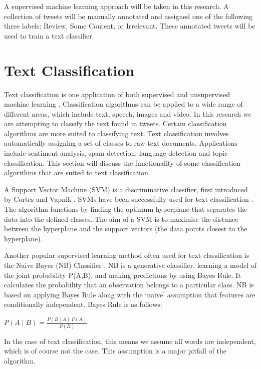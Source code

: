 A supervised machine learning approach will be taken in this research. A collection of tweets will be manually annotated and assigned one of the following three labels: Review, Some Content, or Irrelevant. These annotated tweets will be used to train a text classifier. 

\section{Text Classification}

Text classification is one application of both supervised and unsupervised machine learning \cite{khan2010}. Classification algorithms can be applied to a wide range of different areas, which include text, speech, images and video. In this research we are attempting to classify the text found in tweets. Certain classification algorithms are more suited to classifying text. Text classification involves automatically assigning a set of classes to raw text documents. Applications include sentiment analysis, spam detection, language detection and topic classification. This section will discuss the functionality of some classification algorithms that are suited to text classification. 



A Support Vector Machine (SVM) is a discriminative classifier, first introduced by Cortes and Vapnik \cite{Vapnik1995,  Vapnik21995}. SVMs have been successfully used for text classification \cite{Joachims1998, tong2001support}. The algorithm functions by finding the optimum hyperplane that separates the data into the defined classes. The aim of a SVM is to maximise the distance between the hyperplane and the support vectors (the data points closest to the hyperplane). 

Another popular supervised learning method often used for text classification is the Naive Bayes (NB) Classifier  \cite{NaiveBayes1998}. NB is a generative classifier, learning a model of the joint probability P(A,B), and making predictions by using Bayes Rule. It calculates the probability that an observation belongs to a particular class. NB is based on applying Bayes Rule along with the ‘naive’ assumption that features are conditionally independent. Bayes Rule is as follows:
\begin{center}
    \(P(A\mid B)=\frac{P(B\mid A)\:P(A)}{P(B)}\) 
\end{center}
In the case of text classification, this means we assume all words are independent, which is of course not the case. This assumption is a major pitfall of the algorithm. 

